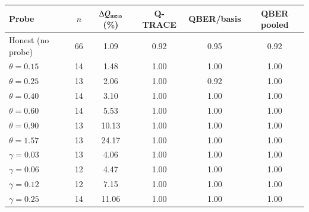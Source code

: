 \begin{tabular}{lccccc}
\toprule
Probe & $n$ & $\Delta Q_{\rm meas}$ (\%) & Q-TRACE & QBER/basis & QBER pooled \\
\midrule
Honest (no probe) & 66 & 1.09 & 0.92 & 0.95 & 0.92 \\
\midrule
$\theta=0.15$ & 14 & 1.48 & 1.00 & 1.00 & 1.00 \\
$\theta=0.25$ & 13 & 2.06 & 1.00 & 0.92 & 1.00 \\
$\theta=0.40$ & 14 & 3.10 & 1.00 & 1.00 & 1.00 \\
$\theta=0.60$ & 14 & 5.53 & 1.00 & 1.00 & 1.00 \\
$\theta=0.90$ & 13 & 10.13 & 1.00 & 1.00 & 1.00 \\
$\theta=1.57$ & 13 & 24.17 & 1.00 & 1.00 & 1.00 \\
\midrule
$\gamma=0.03$ & 13 & 4.06 & 1.00 & 1.00 & 1.00 \\
$\gamma=0.06$ & 12 & 4.47 & 1.00 & 1.00 & 1.00 \\
$\gamma=0.12$ & 12 & 7.15 & 1.00 & 1.00 & 1.00 \\
$\gamma=0.25$ & 14 & 11.06 & 1.00 & 1.00 & 1.00 \\
\bottomrule
\end{tabular}
